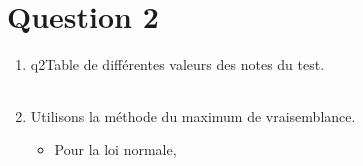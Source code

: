 \section{Question 2}
\begin{enumerate}
  \item
    \begin{mytable}{q2}{Table de différentes valeurs des notes du test.}
      \begin{tabular}{ll}
        
      \end{tabular}
    \end{mytable}
  \item Utilisons la méthode du maximum de vraisemblance.
    \begin{itemize}
      \item
        Pour la loi normale,
    \end{itemize}
\end{enumerate}
